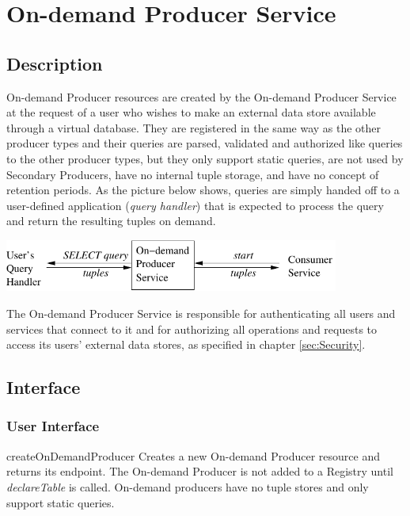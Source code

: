 \section{On-demand Producer Service}\label{sec:OnDemandProducer}
\subsection{Description}

On-demand Producer resources are created by the On-demand Producer Service
at the request of a user who wishes to make an external data store available
through a virtual database. They are registered in the same way as the other
producer types and their queries are parsed, validated and authorized like
queries to the other producer types, but they only support static queries,
are not used by Secondary Producers, have no internal tuple storage, and
have no concept of retention periods. As the picture below shows, queries are
simply handed off to a user-defined application (\textit{query handler}) that
is expected to process the query and return the resulting tuples on demand.

\begin{center}
\includegraphics[width=110mm]{odp_detail}
\end{center}

The On-demand Producer Service is responsible for authenticating all users and
services that connect to it and for authorizing all operations and requests to
access its users' external data stores, as specified in chapter
\ref{sec:Security}.

\subsection{Interface}

\subsubsection{User Interface}

\begin{method}{createOnDemandProducer}
\desc
Creates a new On-demand Producer resource and returns its endpoint. The
On-demand Producer is not added to a Registry until \textit{declareTable} is
called. On-demand producers have no tuple stores and only support static
queries.
\end{method}


